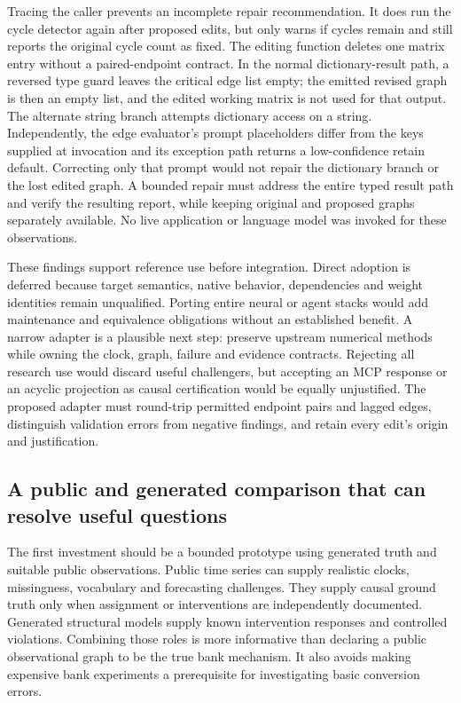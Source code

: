 Tracing the caller prevents an incomplete repair recommendation. It does
run the cycle detector again after proposed edits, but only warns if cycles
remain and still reports the original cycle count as fixed. The editing
function deletes one matrix entry without a paired-endpoint contract. In
the normal dictionary-result path, a reversed type guard leaves the critical
edge list empty; the emitted revised graph is then an empty list, and the
edited working matrix is not used for that output. The alternate string
branch attempts dictionary access on a string. Independently, the edge
evaluator's prompt placeholders differ from the keys supplied at invocation
and its exception path returns a low-confidence retain default. Correcting
only that prompt would not repair the dictionary branch or the lost edited
graph. A bounded repair must address the entire typed result path and verify
the resulting report, while keeping original and proposed graphs separately
available. No live application or language model was invoked for these
observations.
\citep{exec15_latent_causalagent}

These findings support reference use before integration. Direct adoption is
deferred because target semantics, native behavior, dependencies and weight
identities remain unqualified. Porting entire neural or agent stacks would
add maintenance and equivalence obligations without an established benefit.
A narrow adapter is a plausible next step: preserve upstream numerical
methods while owning the clock, graph, failure and evidence contracts.
Rejecting all research use would discard useful challengers, but accepting
an MCP response or an acyclic projection as causal certification would be
equally unjustified. The proposed adapter must round-trip permitted endpoint
pairs and lagged edges, distinguish validation errors from negative findings,
and retain every edit's origin and justification.
\citep{exec15_latent_design}

\subsection{A public and generated comparison that can resolve useful questions}

The first investment should be a bounded prototype using generated truth
and suitable public observations. Public time series can supply realistic
clocks, missingness, vocabulary and forecasting challenges. They supply
causal ground truth only when assignment or interventions are independently
documented. Generated structural models supply known intervention responses
and controlled violations. Combining those roles is more informative than
declaring a public observational graph to be the true bank mechanism.
It also avoids making expensive bank experiments a prerequisite for
investigating basic conversion errors.
\citep{exec15_latent_design}

